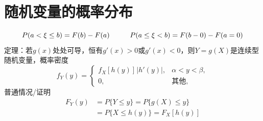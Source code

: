 \documentclass{article}
\begin{document}
\section*{\center\Huge 随机变量的概率分布}
\begin{tcolorbox}
    [colback=greenshade,colframe=Green!50!black,title=\textbf{基本概念}]
    \[P(a<\xi\leq b )=F(b)-F(a) \hspace*{1cm} P(a\leq\xi< b)=F(b-0)-F(a=0)\]
    定理：若$g(x)$处处可导，恒有$g'(x)>0\text{或}g'(x)<0$，则$Y=g(X)$是连续型随机变量，概率密度
    \[f_Y(y)=\begin{cases}
        f_X[h(y)]\hspace{1pt}|h'(y)|,&\alpha<y<\beta ,\\
        0,&\text{其他},
    \end{cases}\]
    普通情况/证明
    \[
        \begin{split}
             F_Y(y)&=P\{Y\leq y\}=P\{g(X)\leq y\}\\
             &=P\{X\leq h(y)\}=F_X[h(y)]
        \end{split}
    \]
\end{tcolorbox}
\end{document}
